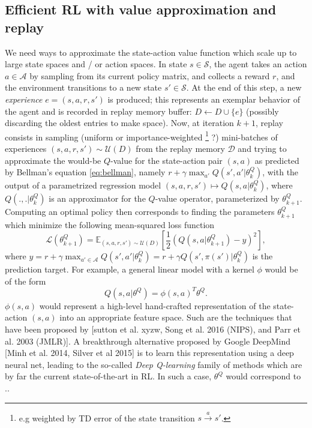 \documentclass{article} %
\begin{document}
\subsection{Efficient RL with value approximation and replay}
We need ways to approximate the state-action value function
which scale up to large state spaces and / or action spaces.
In state $s \in \mathcal S$, the agent takes an action $a \in \mathcal A$
by sampling from its current policy matrix, and collects a reward $r$,
and the environment transitions to a new state $s' \in \mathcal S$. At the end of
this step, a new \textit{experience} $e = (s,a,r,s')$ is produced; this represents an exemplar
behavior of the agent and is recorded in replay memory buffer:
$D \leftarrow D \cup \{e\}$ (possibly discarding the oldest entries to make space).
Now, at iteration $k+1$, replay consists in sampling (uniform or importance-weighted
\footnote{e.g weighted by TD error of the state transition $s \overset{a}{\rightarrow} s'$.} ?)  mini-batches of experiences
$(s, a, r, s') \sim \mathcal U(D)$ from the replay memory $\mathcal D$ and trying to
approximate
the would-be $Q$-value for the state-action pair $(s,a)$ as predicted by Bellman's equation \eqref{eq:bellman}, namely
$r + \gamma \max_{a'} Q(s', a'|\theta^Q_k)$, with the output of a parametrized regression model $(s,a,r,s')
\mapsto {Q}(s, a|\theta^Q_{k})$, where $Q(.,.|\theta^Q_{k})$ is an approximator for the $Q$-value operator,  parameterized by $\theta^Q_{k+1}$.
Computing an optimal policy then corresponds to finding the parameters $\theta^Q_{k+1}$ which minimize the following mean-squared loss function
\begin{equation}
  \mathcal L(\theta^Q_{k+1})
  = \mathbb E_{(s, a, r, s') \sim \mathcal U(D)}\left[\frac{1}{2}(Q(s, a|\theta^Q_{k+1}) - y)^2\right],
  \label{eq:oracle}
\end{equation}
where
$ y = r + \gamma \max_{a' \in \mathcal A} Q(s', a'|\theta^Q_k) = r + \gamma Q(s', \pi(s')|\theta^Q_k)$ is the prediction target.
For example, a general linear model with a kernel $\phi$ would be of the
form
$${Q}(s, a|\theta^Q) = \phi(s,a)^T\theta^Q.$$
$\phi(s,a)$ would represent a high-level hand-crafted representation of the state-action $(s,a)$ into an appropriate
feature space. Such are the techniques that have been proposed by [sutton et al. xyzw, Song et al. 2016 (NIPS),
  and Parr et al. 2003 (JMLR)].
A breakthrough alternative proposed by Google DeepMind [Minh et al. 2014, Silver et al 2015] is to learn this
representation using a deep neural net, leading to the so-called \textit{Deep Q-learning} family of methods which
are by far the current state-of-the-art in RL. In such a case, $\theta^Q$
would correspond to ..
\end{document}
